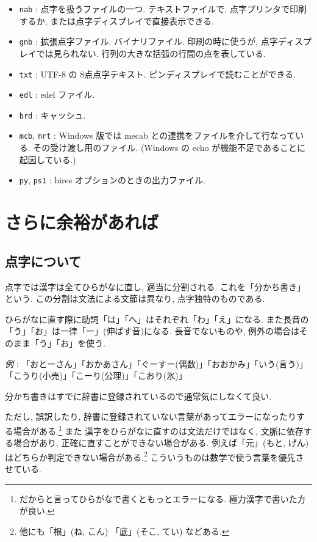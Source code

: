 \documentclass[lualatex,ja=standard,jafont=haranoaji]{bxjsarticle}
\def\eg{\par\emph{例} :  }
\begin{document}
\begin{itemize}
\item \verb|nab| : 点字を扱うファイルの一つ. テキストファイルで, 点字プリンタで印刷するか, または点字ディスプレイで直接表示できる.
\item \verb|gnb| : 拡張点字ファイル. バイナリファイル. 印刷の時に使うが, 点字ディスプレイでは見られない.
行列の大きな括弧の行間の点を表している.
\item \verb|txt| : UTF-8 の 8点点字テキスト. ピンディスプレイで読むことができる. %
\item \verb|edl| : edel ファイル.
\item \verb|brd| : キャッシュ.
\item \verb|mcb|, \verb|mrt| : Windows 版では mecab との連携をファイルを介して行なっている. その受け渡し用のファイル. (Windows の echo が機能不足であることに起因している.)
\item \verb|py|, \verb|ps1| : hires オプションのときの出力ファイル. 
\end{itemize}



\section{さらに余裕があれば}

\subsection{点字について}

点字では漢字は全てひらがなに直し, 適当に分割される. これを「分かち書き」という.
この分割は文法による文節は異なり, 点字独特のものである.

ひらがなに直す際に助詞「は」「へ」はそれぞれ「わ」「え」になる.
また長音の「う」「お」は一律「ー」(伸ばす音)になる.
長音でないものや, 例外の場合はそのまま「う」「お」を使う.

\eg 「おとーさん」「おかあさん」「ぐーすー(偶数)」「おおかみ」「いう(言う)」「こうり(小売)」「こーり(公理)」「こおり(氷)」

分かち書きはすでに辞書に登録されているので通常気にしなくて良い.

ただし,
誤訳したり, 辞書に登録されていない言葉があってエラーになったりする場合がある.\footnote{だからと言ってひらがなで書くともっとエラーになる. 極力漢字で書いた方が良い.}
また
漢字をひらがなに直すのは文法だけではなく, 文脈に依存する場合があり, 正確に直すことができない場合がある.
例えば「元」(もと, げん) はどちらか判定できない場合がある.\footnote{他にも「根」(ね, こん)
「底」(そこ, てい)
などある.}
こういうものは数学で使う言葉を優先させている.
\end{document}
